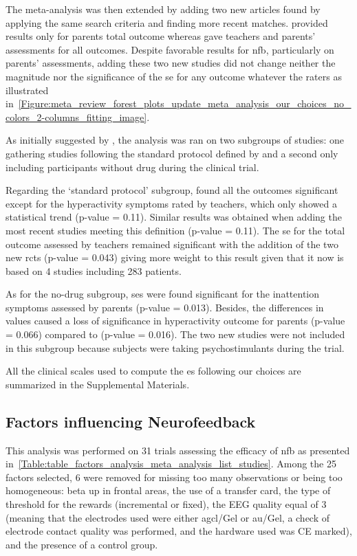 The meta-analysis was then extended by adding two new articles \citep{Strehl2017, Baumeister2016} found 
by applying the same search criteria and finding more recent matches. \citet{Baumeister2016} provided results 
only for parents total outcome whereas \citet{Strehl2017} gave teachers and parents' assessments for all outcomes. 
Despite favorable results for \gls{nfb}, particularly on parents' assessments, adding these two new studies did not 
change neither the magnitude nor the significance of the \gls{se} for any outcome whatever the raters
as illustrated in~\ref{Figure:meta_review_forest_plots_update_meta_analysis_our_choices_no_colors_2-columns_fitting_image}. 
 
As initially suggested by \citeauthor{Cortese2016}, the analysis was ran on two subgroups of studies: one gathering 
studies following the standard protocol defined by \citet{Arns2014} and a second only including participants without 
drug during the clinical trial. 

Regarding the `standard protocol' subgroup, \citet{Cortese2016} found all the outcomes significant except for the 
hyperactivity symptoms rated by teachers, which only showed a statistical trend (p-value = 0.11). Similar results 
was obtained when adding the most recent studies meeting this definition \citep{Strehl2017} (p-value = 0.11). 
The \gls{se} for the total outcome assessed by teachers remained significant with the addition of the two new
\glspl{rct} (p-value = 0.043) giving more weight to this result given that it now is based on 4 studies including 283
patients.

As for the no-drug subgroup, \glspl{se} were found significant for the inattention symptoms assessed by parents (p-value = 0.013). 
Besides, the differences in \citet{Arnold2014} values caused a loss of significance in hyperactivity outcome for parents 
(p-value = 0.066) compared to \citet{Cortese2016} (p-value = 0.016). The two new studies were not included in this 
subgroup because subjects were taking psychostimulants during the trial.

All the clinical scales used to compute the \gls{es} following our choices are summarized in the Supplemental Materials.

\subsection{Factors influencing Neurofeedback}

This analysis was performed on 31 trials assessing the efficacy of \gls{nfb} as presented 
in~\ref{Table:table_factors_analysis_meta_analysis_list_studies}. Among the 25 factors selected, 6 were 
removed for missing too many observations or being too homogeneous: beta up in frontal areas, 
the use of a transfer card, the type of threshold for the rewards (incremental or fixed), the EEG quality equal of 3
(meaning that the electrodes used were either \gls{agcl}/Gel or \gls{au}/Gel, a check of electrode contact quality was
performed, and the hardware used was CE marked), and the presence of a control group. 

